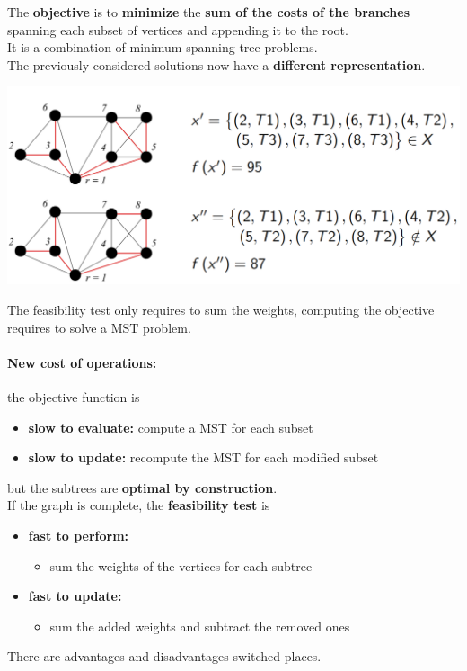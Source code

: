 \documentclass[11pt]{article}
\begin{document}
	The \textbf{objective} is to \textbf{minimize} the \textbf{sum of the costs of the branches} spanning each subset of vertices and appending it to the root.\\
	It is a combination of minimum spanning tree problems.\\
	
	The previously considered solutions now have a \textbf{different representation}.
	\begin{center}
		\includegraphics[width=0.9\columnwidth]{img/CSTP2}
	\end{center}
	The feasibility test only requires to sum the weights, computing the objective requires to solve a MST problem.
	
	\newpage
	
	\paragraph{New cost of operations:} the objective function is
	\begin{itemize}
		\item \textbf{slow to evaluate:} compute a MST for each subset
		\item \textbf{slow to update:} recompute the MST for each modified subset
	\end{itemize}
	but the subtrees are \textbf{optimal by construction}.\\
	
	If the graph is complete, the \textbf{feasibility test} is
	\begin{itemize}
		\item \textbf{fast to perform:}
		\begin{itemize}
			\item sum the weights of the vertices for each subtree
		\end{itemize}
		\item \textbf{fast to update:}
		\begin{itemize}
			\item sum the added weights and subtract the removed ones
		\end{itemize}
	\end{itemize}
	There are advantages and disadvantages switched places.\\
	
\end{document}
